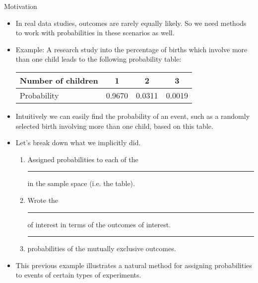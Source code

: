\documentclass{article}
\newcommand{\blankul}[1]{\rule[-1.5mm]{#1}{0.15mm}}	%
\begin{document}
Motivation\bigskip
\begin{itemize}
    \item In real data studies, outcomes are rarely equally likely. So we need methods to work with probabilities in these scenarios as well.
    \item Example: A research study into the percentage of births which involve more than one child leads to the following probability table:\bigskip
    \begin{center}
        \begin{tabular}{| l || c | c | c |}
        \hline
        Number of children & 1 & 2 & 3\\
        \hline
        Probability & 0.9670 & 0.0311 & 0.0019\\
        \hline
        \end{tabular}
    \end{center}\bigskip
    \item[] Intuitively we can easily find the probability of an event, such as a randomly selected birth involving more than one child, based on this table.\vspace{70pt}
    \item[] Let's break down what we implicitly did.\bigskip
    \begin{enumerate}
        \item Assigned probabilities to each of the \blankul{4.5cm} in the sample space (i.e. the table).
        \item Wrote the \blankul{1.5cm} of interest in terms of the outcomes of interest.
        \item \blankul{1cm} probabilities of the mutually exclusive outcomes.
    \end{enumerate}\bigskip
    \item This previous example illustrates a natural method for assigning probabilities to events of certain types of experiments.
\end{itemize}\bigskip
\end{document}
